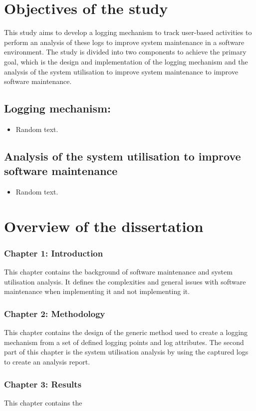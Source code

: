 \section{Objectives of the study}
This study aims to develop a logging mechanism to track user-based activities to perform an analysis of these logs to improve system maintenance in a software environment. The study is divided into two components to achieve the primary goal, which is the design and implementation of the logging mechanism and the analysis of the system utilisation to improve system maintenance to improve software maintenance.

\subsection{Logging mechanism:}
\begin{itemize}
	\item Random text.
\end{itemize}

\subsection{Analysis of the system utilisation to improve software maintenance}
\begin{itemize}
	\item Random text.
\end{itemize}

\section{Overview of the dissertation}
\subsubsection{Chapter 1: Introduction}
This chapter contains the background of software maintenance and system utilisation analysis. It defines the complexities and general issues with software maintenance when implementing it and not implementing it.

\subsubsection{Chapter 2: Methodology}
This chapter contains the design of the generic method used to create a logging mechanism from a set of defined logging points and log attributes. The second part of this chapter is the system utilisation analysis by using the captured logs to create an analysis report.

\subsubsection{Chapter 3: Results}
This chapter contains the 
